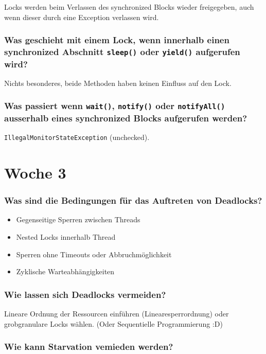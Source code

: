 \documentclass[10pt,a4paper]{scrartcl}
\begin{document}
Locks werden beim Verlassen des synchronized Blocks wieder freigegeben, auch wenn dieser durch eine
Exception verlassen wird.
  
\subsubsection{Was geschieht mit einem Lock, wenn innerhalb einen synchronized Abschnitt
\texttt{sleep()} oder \texttt{yield()} aufgerufen wird?}

Nichts besonderes, beide Methoden haben keinen Einfluss auf den Lock.
  
\subsubsection{Was passiert wenn \texttt{wait()}, \texttt{notify()} oder \texttt{notifyAll()}
ausserhalb eines synchronized Blocks aufgerufen werden?}

\texttt{IllegalMonitorStateException} (unchecked).


\section{Woche 3}

\subsubsection{Was sind die Bedingungen für das Auftreten von Deadlocks?}

\begin{itemize}
	\item Gegenseitige Sperren zwischen Threads
	\item Nested Locks innerhalb Thread
	\item Sperren ohne Timeouts oder Abbruchmöglichkeit
	\item Zyklische Warteabhängigkeiten
\end{itemize}
  
\subsubsection{Wie lassen sich Deadlocks vermeiden?}

Lineare Ordnung der Ressourcen einführen (Linearesperrordnung) oder grobgranulare Locks wählen.
(Oder Sequentielle Programmierung :D)

\subsubsection{Wie kann Starvation vemieden werden?}
\end{document}
